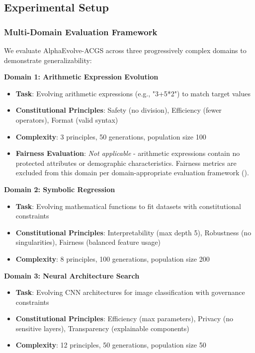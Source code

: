 \documentclass[sigconf,natbib]{acmart}
\begin{document}
\subsection{Experimental Setup}
\label{subsec:experimental_setup}

\subsubsection{Multi-Domain Evaluation Framework}
We evaluate AlphaEvolve-ACGS across three progressively complex domains to demonstrate generalizability:

\textbf{Domain 1: Arithmetic Expression Evolution}
\begin{itemize}
    \item \textbf{Task}: Evolving arithmetic expressions (e.g., "3+5*2") to match target values
    \item \textbf{Constitutional Principles}: Safety (no division), Efficiency (fewer operators), Format (valid syntax)
    \item \textbf{Complexity}: 3 principles, 50 generations, population size 100
    \item \textbf{Fairness Evaluation}: \textit{Not applicable} - arithmetic expressions contain no protected attributes or demographic characteristics. Fairness metrics are excluded from this domain per domain-appropriate evaluation framework ().
\end{itemize}

\textbf{Domain 2: Symbolic Regression}
\begin{itemize}
    \item \textbf{Task}: Evolving mathematical functions to fit datasets with constitutional constraints
    \item \textbf{Constitutional Principles}: Interpretability (max depth 5), Robustness (no singularities), Fairness (balanced feature usage)
    \item \textbf{Complexity}: 8 principles, 100 generations, population size 200
\end{itemize}

\textbf{Domain 3: Neural Architecture Search}
\begin{itemize}
    \item \textbf{Task}: Evolving CNN architectures for image classification with governance constraints
    \item \textbf{Constitutional Principles}: Efficiency (max parameters), Privacy (no sensitive layers), Transparency (explainable components)
    \item \textbf{Complexity}: 12 principles, 50 generations, population size 50
\end{itemize}
\end{document}
